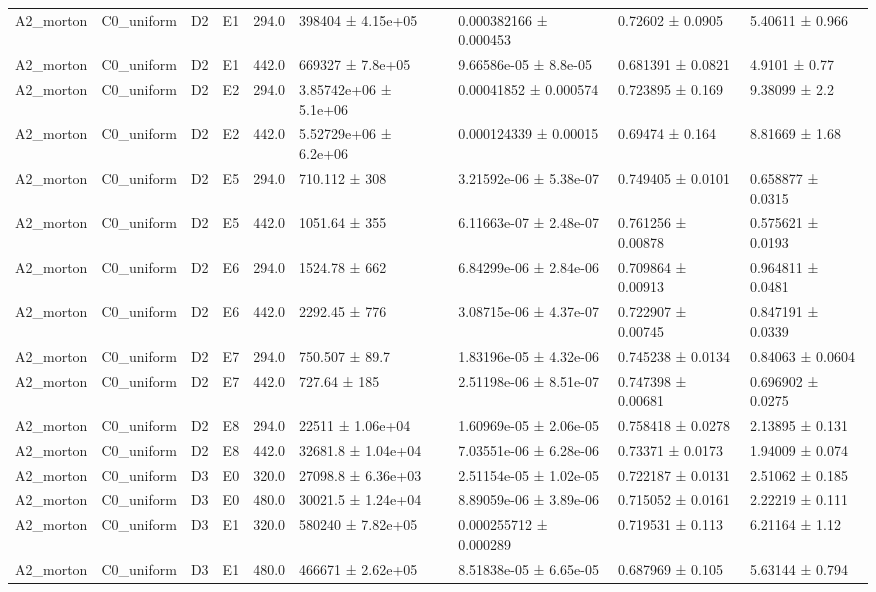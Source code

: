\begin{table}
\begin{tabular}{lllllllll}
A2\_morton & C0\_uniform & D2 & E1 & 294.0 & 398404 ± 4.15e+05 & 0.000382166 ± 0.000453 & 0.72602 ± 0.0905 & 5.40611 ± 0.966 \\
A2\_morton & C0\_uniform & D2 & E1 & 442.0 & 669327 ± 7.8e+05 & 9.66586e-05 ± 8.8e-05 & 0.681391 ± 0.0821 & 4.9101 ± 0.77 \\
A2\_morton & C0\_uniform & D2 & E2 & 294.0 & 3.85742e+06 ± 5.1e+06 & 0.00041852 ± 0.000574 & 0.723895 ± 0.169 & 9.38099 ± 2.2 \\
A2\_morton & C0\_uniform & D2 & E2 & 442.0 & 5.52729e+06 ± 6.2e+06 & 0.000124339 ± 0.00015 & 0.69474 ± 0.164 & 8.81669 ± 1.68 \\
A2\_morton & C0\_uniform & D2 & E5 & 294.0 & 710.112 ± 308 & 3.21592e-06 ± 5.38e-07 & 0.749405 ± 0.0101 & 0.658877 ± 0.0315 \\
A2\_morton & C0\_uniform & D2 & E5 & 442.0 & 1051.64 ± 355 & 6.11663e-07 ± 2.48e-07 & 0.761256 ± 0.00878 & 0.575621 ± 0.0193 \\
A2\_morton & C0\_uniform & D2 & E6 & 294.0 & 1524.78 ± 662 & 6.84299e-06 ± 2.84e-06 & 0.709864 ± 0.00913 & 0.964811 ± 0.0481 \\
A2\_morton & C0\_uniform & D2 & E6 & 442.0 & 2292.45 ± 776 & 3.08715e-06 ± 4.37e-07 & 0.722907 ± 0.00745 & 0.847191 ± 0.0339 \\
A2\_morton & C0\_uniform & D2 & E7 & 294.0 & 750.507 ± 89.7 & 1.83196e-05 ± 4.32e-06 & 0.745238 ± 0.0134 & 0.84063 ± 0.0604 \\
A2\_morton & C0\_uniform & D2 & E7 & 442.0 & 727.64 ± 185 & 2.51198e-06 ± 8.51e-07 & 0.747398 ± 0.00681 & 0.696902 ± 0.0275 \\
A2\_morton & C0\_uniform & D2 & E8 & 294.0 & 22511 ± 1.06e+04 & 1.60969e-05 ± 2.06e-05 & 0.758418 ± 0.0278 & 2.13895 ± 0.131 \\
A2\_morton & C0\_uniform & D2 & E8 & 442.0 & 32681.8 ± 1.04e+04 & 7.03551e-06 ± 6.28e-06 & 0.73371 ± 0.0173 & 1.94009 ± 0.074 \\
A2\_morton & C0\_uniform & D3 & E0 & 320.0 & 27098.8 ± 6.36e+03 & 2.51154e-05 ± 1.02e-05 & 0.722187 ± 0.0131 & 2.51062 ± 0.185 \\
A2\_morton & C0\_uniform & D3 & E0 & 480.0 & 30021.5 ± 1.24e+04 & 8.89059e-06 ± 3.89e-06 & 0.715052 ± 0.0161 & 2.22219 ± 0.111 \\
A2\_morton & C0\_uniform & D3 & E1 & 320.0 & 580240 ± 7.82e+05 & 0.000255712 ± 0.000289 & 0.719531 ± 0.113 & 6.21164 ± 1.12 \\
A2\_morton & C0\_uniform & D3 & E1 & 480.0 & 466671 ± 2.62e+05 & 8.51838e-05 ± 6.65e-05 & 0.687969 ± 0.105 & 5.63144 ± 0.794 \\

\end{tabular}
\end{table}
